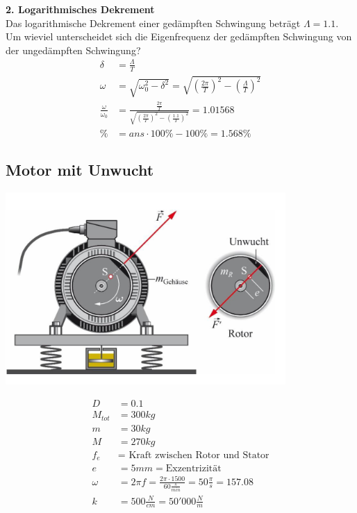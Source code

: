 \textbf{2. Logarithmisches Dekrement}\\
Das logarithmische Dekrement einer gedämpften Schwingung beträgt $\Lambda = 1.1$. Um wieviel unterscheidet sich die Eigenfrequenz der gedämpften Schwingung von der ungedämpften Schwingung?
\begin{align*}
\delta &= \frac{\Lambda}{T}\\
\omega&=\sqrt{\omega_0^2-\delta^2}=\sqrt{\left(\frac{2\pi}{T}\right)^2-\left( \frac{\Lambda}{T}\right)^2}\\
\frac{\omega}{\omega_0}&= \frac{\frac{2\pi}{T}}{\sqrt{\left(\frac{2\pi}{T}\right)^2-\left(\frac{1.1}{T} \right)^2}} = 1.01568\\
\%&= ans\cdot 100\%-100\% = 1.568\%
\end{align*}






\subsection{Motor mit Unwucht}
\begin{minipage}{0.49\textwidth}
\includegraphics[width=0.8\textwidth]{bilder/motor_unwucht.png}
\end{minipage}
\begin{minipage}{0.49\textwidth}
\begin{align*}
D&=0.1\\
M_{tot} &= 300kg\\
m&= 30kg\\
M&= 270kg\\
f_e&= \textrm{ Kraft zwischen Rotor und Stator}\\
e&= 5mm = \textrm{Exzentrizität}\\
\omega  &= 2\pi f = \frac{2\pi\cdot 1500}{60\frac{s}{min}} = 50\frac{\pi}{s} = 157.08\\
k&= 500\frac{N}{cm} = 50'000\frac{N}{m}
\end{align*}
\end{minipage}

